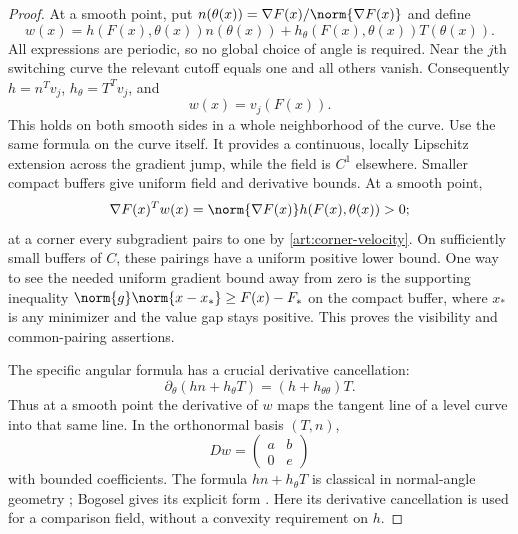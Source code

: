 \begin{proof}
At a smooth point, put
$n(\theta(x))=\nabla F(x)/\norm{\nabla F(x)}$ and define
\begin{equation}\label{art:planar-field-formula}
 w(x)=h(F(x),\theta(x))n(\theta(x))
       +h_\theta(F(x),\theta(x))T(\theta(x)).
\end{equation}
All expressions are periodic, so no global choice of angle is required.
Near the $j$th switching curve the relevant cutoff equals one and all others
vanish. Consequently $h=n^Tv_j$, $h_\theta=T^Tv_j$, and
\begin{equation}\label{art:planar-corner-field}
 w(x)=v_j(F(x)).
\end{equation}
This holds on both smooth sides in a whole neighborhood of the curve.
Use the same formula on the curve itself. It provides a continuous, locally
Lipschitz extension across the gradient jump, while the field is $C^1$
elsewhere. Smaller compact buffers give uniform field and derivative bounds.
At a smooth point,
\[
 \nabla F(x)^Tw(x)=\norm{\nabla F(x)}h(F(x),\theta(x))>0;
\]
at a corner every subgradient pairs to one by
\eqref{art:corner-velocity}. On sufficiently small buffers of $C$, these
pairings have a uniform positive lower bound. One way to see the needed
uniform gradient bound away from zero is the supporting inequality
$\norm{g}\norm{x-x_*}\ge F(x)-F_*$ on the compact buffer, where $x_*$ is
any minimizer and the value gap stays positive. This proves the visibility
and common-pairing assertions.

The specific angular formula has a crucial derivative cancellation:
\begin{equation}\label{art:planar-tangent-cancellation}
 \partial_\theta(hn+h_\theta T)=(h+h_{\theta\theta})T.
\end{equation}
Thus at a smooth point the derivative of $w$ maps the tangent line of a
level curve into that same line. In the orthonormal basis $(T,n)$,
\[
 Dw=\begin{pmatrix}a&b\\0&e\end{pmatrix}
\]
with bounded coefficients. The formula $hn+h_\theta T$ is classical in
normal-angle geometry \cite{geom_Bogosel2023}; Bogosel gives its explicit
form . Here its derivative cancellation
is used for a comparison field, without a convexity requirement on $h$.


\end{proof}
